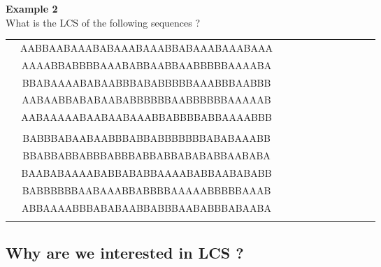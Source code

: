 \documentclass{beamer}
\begin{document}
\begin{frame}[t]
  \textbf{Example 2}\\
  What is the LCS of the following sequences ?
  \begin{center}
    \begin{tabular}{rccccccccccc}
      \only<2>{
        $S_3$ :
       & AABBAABAAABABAAABAAABBABAAABAAABAAA \\
       & AAAABBABBBBAAABABBAABBAABBBBBAAAABA \\
       & BBABAAAABABAABBBABABBBBBAAABBBAABBB \\
       & AABAABBABABAABABBBBBBAABBBBBBAAAAAB \\
       & AABAAAAABAABAABAAABBABBBBABBAAAABBB \\
      }                                      \\
      \only<2>{
        $S_4$ :
       & BABBBABAABAABBBABBABBBBBBBABABAAABB \\
       & BBABBABBABBBABBBABBABBABABABBAABABA \\
       & BAABABAAAABABBABABBAAAABABBAABABABB \\
       & BABBBBBBAABAAABBABBBBAAAAABBBBBAAAB \\
       & ABBAAAABBBABABAABBABBBAABABBBABAABA \\
      }
    \end{tabular}
  \end{center}
\end{frame}

\subsection{Why are we interested in LCS ?}
\end{document}
